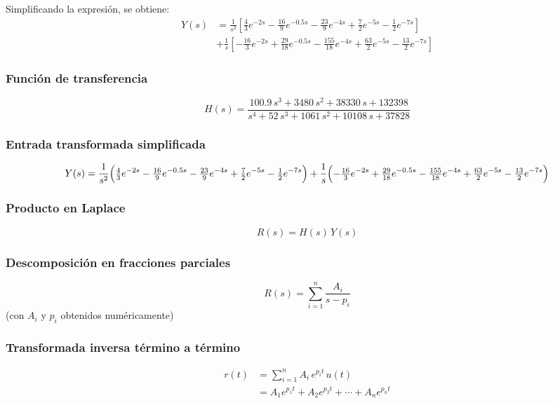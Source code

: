 \documentclass[11pt,letterpaper]{article}
\begin{document}
Simplificando la expresión, se obtiene:
\begin{equation}
\begin{aligned}
Y(s) &=
\frac{1}{s^2}\left[
\tfrac{4}{3}e^{-2s}
- \tfrac{16}{9}e^{-0.5s}
- \tfrac{23}{9}e^{-4s}
+ \tfrac{7}{2}e^{-5s}
- \tfrac{1}{2}e^{-7s}
\right] \\
&+
\frac{1}{s}\left[
- \tfrac{16}{3}e^{-2s}
+ \tfrac{29}{18}e^{-0.5s}
- \tfrac{155}{18}e^{-4s}
+ \tfrac{63}{2}e^{-5s}
- \tfrac{13}{2}e^{-7s}
\right]
\end{aligned}
\end{equation}

\subsubsection{Función de transferencia}
\begin{equation}
H(s)=\frac{100.9\,s^3+3480\,s^2+38330\,s+132398}
       {s^4+52\,s^3+1061\,s^2+10108\,s+37828}
\end{equation}

\subsubsection{Entrada transformada simplificada}
\begin{equation}
Y(s)=
\frac{1}{s^2}\Bigl(\tfrac{4}{3}e^{-2s}-\tfrac{16}{9}e^{-0.5s}
              -\tfrac{23}{9}e^{-4s}+\tfrac{7}{2}e^{-5s}-\tfrac{1}{2}e^{-7s}\Bigr)
+
\frac{1}{s}\Bigl(-\tfrac{16}{3}e^{-2s}+\tfrac{29}{18}e^{-0.5s}
              -\tfrac{155}{18}e^{-4s}+\tfrac{63}{2}e^{-5s}-\tfrac{13}{2}e^{-7s}\Bigr)
\end{equation}

\subsubsection{Producto en Laplace}
\begin{equation}
R(s)=H(s)\,Y(s)
\end{equation}

\subsubsection{Descomposición en fracciones parciales}
\begin{equation}
R(s)=\sum_{i=1}^n\frac{A_i}{s-p_i}
\end{equation}
\noindent
(con \(A_i\) y \(p_i\) obtenidos numéricamente)

\subsubsection{Transformada inversa término a término}
\begin{align}
r(t)&=\sum_{i=1}^n A_i\,e^{p_i t} \,u(t)\\
     &=A_1e^{p_1t}+A_2e^{p_2t}+\cdots +A_ne^{p_nt}
\end{align}
\end{document}
